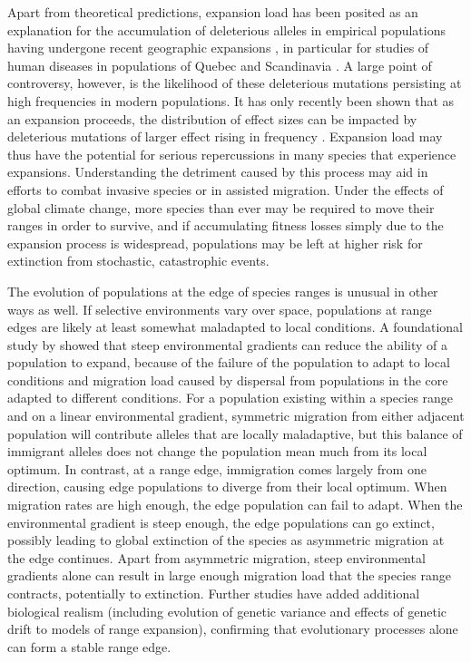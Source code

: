 Apart from theoretical predictions, expansion load has been posited as an explanation for the accumulation of deleterious alleles in empirical populations having undergone recent geographic expansions \citep{Karlsson:2014}, in particular for studies of human diseases in populations of Quebec \citep{Scriver:2001, Yotova:2005, Labuda:1997} and Scandinavia \citep{Norio:2003}%
. A large point of controversy, however, is the likelihood of these deleterious mutations persisting at high frequencies in modern populations. It has only recently been shown that as an expansion proceeds, the distribution of effect sizes can be impacted by deleterious mutations of larger effect rising in frequency \citep{Henn:2015}. Expansion load may thus have the potential for serious repercussions in many species that experience expansions. Understanding the detriment caused by this process may aid in efforts to combat invasive species or in assisted migration. Under the effects of global climate change, more species than ever may be required to move their ranges in order to survive, and if accumulating fitness losses simply due to the expansion process is widespread, populations may be left at higher risk for extinction from stochastic, catastrophic events. %

The evolution of populations at the edge of species ranges is unusual in other ways as well. If selective environments vary over space, populations at range edges are likely at least somewhat maladapted to local conditions.  A foundational study by \citet{Kirkpatrick:1997} showed that steep environmental gradients can reduce the ability of a population to expand, because of the failure of the population to adapt to local conditions and migration load caused by dispersal from populations in the core adapted to different conditions. For a population existing within a species range and on a linear environmental gradient, symmetric migration from either adjacent population will contribute alleles that are locally maladaptive, but this balance of immigrant alleles does not change the population mean much from its local optimum. In contrast, at a range edge, immigration comes largely from one direction, causing edge populations to diverge from their local optimum. When migration rates are high enough, the edge population can fail to adapt.  When the environmental gradient is steep enough, the edge populations can go extinct, possibly leading to global extinction of the species as asymmetric migration at the edge continues. Apart from asymmetric migration, steep environmental gradients alone can result in large enough migration load that the species range contracts, potentially to extinction. Further studies \citep{Barton:2001, Polechova:2015} have added additional biological realism (including evolution of genetic variance and effects of genetic drift to models of range expansion), confirming that evolutionary processes alone can form a stable range edge.

